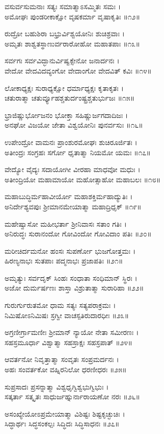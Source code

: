 ವಸುರ್ವಸುಮನಾಃ ಸತ್ಯಃ ಸಮಾತ್ಮಾಽಸಮ್ಮಿತಃ ಸಮಃ ।\\
ಅಮೋಘಃ ಪುಂಡರೀಕಾಕ್ಷೋ ವೃಷಕರ್ಮಾ ವೃಷಾಕೃತಿಃ ॥೧೨॥

ರುದ್ರೋ ಬಹುಶಿರಾ ಬಭ್ರುರ್ವಿಶ್ವಯೋನಿಃ ಶುಚಿಶ್ರವಾಃ ।\\
ಅಮೃತಃ ಶಾಶ್ವತಸ್ಥಾಣುರ್ವರಾರೋಹೋ ಮಹಾತಪಾಃ ॥೧೩॥

ಸರ್ವಗಃ ಸರ್ವವಿದ್ಭಾನುರ್ವಿಷ್ವಕ್ಸೇನೋ ಜನಾರ್ದನಃ ।\\
ವೇದೋ ವೇದವಿದವ್ಯಂಗೋ ವೇದಾಂಗೋ ವೇದವಿತ್ ಕವಿಃ ॥೧೪॥

ಲೋಕಾಧ್ಯಕ್ಷಃ ಸುರಾಧ್ಯಕ್ಷೋ ಧರ್ಮಾಧ್ಯಕ್ಷಃ ಕೃತಾಕೃತಃ ।\\
ಚತುರಾತ್ಮಾ ಚತುರ್ವ್ಯೂಹಶ್ಚತುರ್ದಂಷ್ಟ್ರಶ್ಚತುರ್ಭುಜಃ ॥೧೫॥

ಭ್ರಾಜಿಷ್ಣುರ್ಭೋಜನಂ ಭೋಕ್ತಾ ಸಹಿಷ್ಣುರ್ಜಗದಾದಿಜಃ ।\\
ಅನಘೋ ವಿಜಯೋ ಜೇತಾ ವಿಶ್ವಯೋನಿಃ ಪುನರ್ವಸುಃ ॥೧೬॥

ಉಪೇಂದ್ರೋ ವಾಮನಃ ಪ್ರಾಂಶುರಮೋಘಃ ಶುಚಿರೂರ್ಜಿತಃ ।\\
ಅತೀಂದ್ರಃ ಸಂಗ್ರಹಃ ಸರ್ಗೋ ಧೃತಾತ್ಮಾ ನಿಯಮೋ ಯಮಃ ॥೧೭॥

ವೇದ್ಯೋ ವೈದ್ಯಃ ಸದಾಯೋಗೀ ವೀರಹಾ ಮಾಧವೋ ಮಧುಃ ।\\
ಅತೀಂದ್ರಿಯೋ ಮಹಾಮಾಯೋ ಮಹೋತ್ಸಾಹೋ ಮಹಾಬಲಃ ॥೧೮॥

ಮಹಾಬುದ್ಧಿರ್ಮಹಾವೀರ್ಯೋ ಮಹಾಶಕ್ತಿರ್ಮಹಾದ್ಯುತಿಃ ।\\
ಅನಿರ್ದೇಶ್ಯವಪುಃ ಶ್ರೀಮಾನಮೇಯಾತ್ಮಾ ಮಹಾದ್ರಿಧೃಕ್ ॥೧೯॥

ಮಹೇಷ್ವಾಸೋ ಮಹೀಭರ್ತಾ ಶ್ರೀನಿವಾಸಃ ಸತಾಂ ಗತಿಃ ।\\
ಅನಿರುದ್ಧಃ ಸುರಾನಂದೋ ಗೋವಿಂದೋ ಗೋವಿದಾಂ ಪತಿಃ ॥೨೦॥

ಮರೀಚಿರ್ದಮನೋ ಹಂಸಃ ಸುಪರ್ಣೋ ಭುಜಗೋತ್ತಮಃ ।\\
ಹಿರಣ್ಯನಾಭಃ ಸುತಪಾಃ ಪದ್ಮನಾಭಃ ಪ್ರಜಾಪತಿಃ ॥೨೧॥

ಅಮೃತ್ಯುಃ ಸರ್ವದೃಕ್ ಸಿಂಹಃ ಸಂಧಾತಾ ಸಂಧಿಮಾನ್ ಸ್ಥಿರಃ ।\\
ಅಜೋ ದುರ್ಮರ್ಷಣಃ ಶಾಸ್ತಾ ವಿಶ್ರುತಾತ್ಮಾ ಸುರಾರಿಹಾ ॥೨೨॥

ಗುರುರ್ಗುರುತಮೋ ಧಾಮ ಸತ್ಯಃ ಸತ್ಯಪರಾಕ್ರಮಃ ।\\
ನಿಮಿಷೋಽನಿಮಿಷಃ ಸ್ರಗ್ವೀ ವಾಚಸ್ಪತಿರುದಾರಧೀಃ ॥೨೩॥

ಅಗ್ರಣೀರ್ಗ್ರಾಮಣೀಃ ಶ್ರೀಮಾನ್ ನ್ಯಾಯೋ ನೇತಾ ಸಮೀರಣಃ ।\\
ಸಹಸ್ರಮೂರ್ಧಾ ವಿಶ್ವಾತ್ಮಾ ಸಹಸ್ರಾಕ್ಷಃ ಸಹಸ್ರಪಾತ್ ॥೨೪॥

ಆವರ್ತನೋ ನಿವೃತ್ತಾತ್ಮಾ ಸಂವೃತಃ ಸಂಪ್ರಮರ್ದನಃ ।\\
ಅಹಃ ಸಂವರ್ತಕೋ ವಹ್ನಿರನಿಲೋ ಧರಣೀಧರಃ ॥೨೫॥

ಸುಪ್ರಸಾದಃ ಪ್ರಸನ್ನಾತ್ಮಾ ವಿಶ್ವಧೃಗ್ವಿಶ್ವಭುಗ್ವಿಭುಃ ।\\
ಸತ್ಕರ್ತಾ ಸತ್ಕೃತಃ ಸಾಧುರ್ಜಹ್ನುರ್ನಾರಾಯಣೋ ನರಃ ॥೨೬॥

ಅಸಂಖ್ಯೇಯೋಽಪ್ರಮೇಯಾತ್ಮಾ ವಿಶಿಷ್ಟಃ ಶಿಷ್ಟಕೃಚ್ಛುಚಿಃ ।\\
ಸಿದ್ಧಾರ್ಥಃ ಸಿದ್ಧಸಂಕಲ್ಪಃ ಸಿದ್ಧಿದಃ ಸಿದ್ಧಿಸಾಧನಃ ॥೨೭॥

